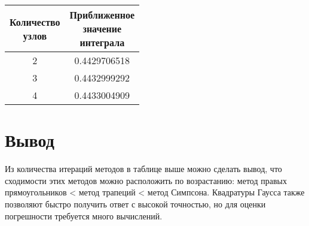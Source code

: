 \documentclass[12pt, a4paper]{article}
\begin{document}
\begin{table}[H]
	\centering
	\begin{tabular}{|c|c|}
	\hline
	\shortstack{Количество\\узлов} & \shortstack{Приближенное \\значение \\ интеграла} \\ \hline
	2 & 0.4429706518 \\ \hline
	3 & 0.4432999292 \\ \hline
	4 & 0.4433004909 \\ \hline
	\end{tabular}
	\end{table}

\section{Вывод}

Из количества итераций методов в таблице выше можно сделать вывод, что сходимости этих методов
можно расположить по возрастанию: метод правых прямоугольников < метод трапеций < метод Симпсона.
Квадратуры Гаусса также позволяют быстро получить ответ с высокой точностью, но для оценки погрешности требуется
много вычислений.
\end{document}

